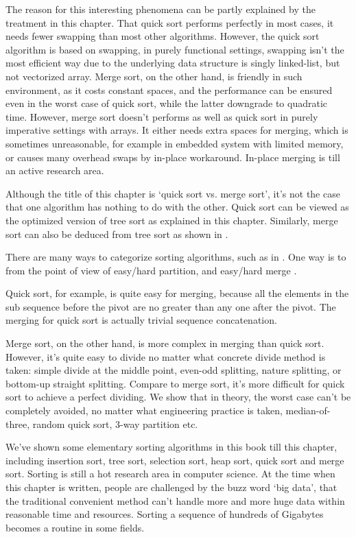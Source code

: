 \documentclass[b5paper]{article}
\begin{document}
The reason for this interesting phenomena can be partly explained by the treatment in this chapter.
That quick sort performs perfectly in most cases, it needs fewer swapping than most other algorithms.
However, the quick sort algorithm is based on swapping, in purely functional settings, swapping isn't
the most efficient way due to the underlying data structure is singly linked-list, but not vectorized
array. Merge sort, on the other hand, is friendly in such environment, as it costs constant spaces,
and the performance can be ensured even in the worst case of quick sort, while the latter downgrade
to quadratic time. However, merge sort doesn't performs as well as quick sort in purely imperative
settings with arrays. It either needs extra spaces for merging, which is sometimes unreasonable, for
example in embedded system with limited memory, or causes many overhead swaps by in-place workaround.
In-place merging is till an active research area.

Although the title of this chapter is `quick sort vs. merge sort', it's not the case that one
algorithm has nothing to do with the other. Quick sort can be viewed as the optimized version of
tree sort as explained in this chapter. Similarly, merge sort can also be deduced from tree sort
as shown in \cite{sort-deriving}.

There are many ways to categorize sorting algorithms, such as in \cite{TAOCP}. One way is to
from the point of view of easy/hard partition, and easy/hard merge \cite{algo-fp}.

Quick sort, for example, is quite easy for merging, because all the elements in the sub
sequence before the pivot are no greater than any one after the pivot. The merging for
quick sort is actually trivial sequence concatenation.

Merge sort, on the other hand, is more complex in merging than quick sort. However, it's
quite easy to divide no matter what concrete divide method is taken:
simple divide at the middle point, even-odd splitting, nature splitting, or bottom-up
straight splitting. Compare to merge sort, it's more difficult for quick sort to
achieve a perfect dividing. We show that in theory, the worst case can't be completely
avoided, no matter what engineering practice is taken, median-of-three, random quick sort,
3-way partition etc.

We've shown some elementary sorting algorithms in this book till this chapter, including
insertion sort, tree sort, selection sort, heap sort, quick sort and merge sort. Sorting
is still a hot research area in computer science. At the time when this chapter is written,
people are challenged by the buzz word `big data', that the traditional convenient method
can't handle more and more huge data within reasonable time and resources.
Sorting a sequence of hundreds of Gigabytes becomes a routine in some fields.
\end{document}
